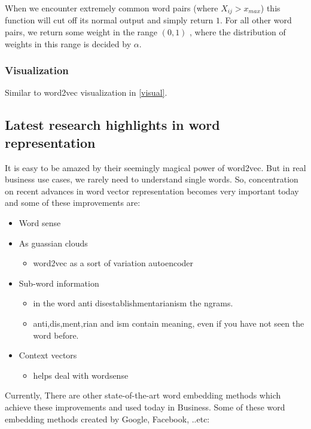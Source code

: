 When we encounter extremely common word pairs (where $X_{ij}>{x_{max}}$) this function will cut off its normal output and simply return $1$. For all other word pairs, we return some weight in the range $(0,1)$ , where the distribution of weights in this range is decided by $\alpha$.
\subsubsection{Visualization}
Similar to word2vec visualization in \ref{visual}.
\subsection{Latest research highlights in word representation}
It is easy to be amazed by their seemingly magical power of word2vec. But in real business use cases, we rarely need to understand single words. So, concentration on recent advances in word vector representation  becomes very important today and some of these improvements are:
\begin{itemize}
    \item Word sense
    \item As guassian clouds
       \begin{itemize}
              \item word2vec as a sort of variation autoencoder
       \end{itemize}
    \item Sub-word information
        \begin{itemize}
              \item in the word anti disestablishmentarianism the ngrams.
              \item anti,dis,ment,rian and ism contain meaning, even if you have not seen the word before.
       \end{itemize}
    \item Context vectors
       \begin{itemize}
             \item helps deal with wordsense
      \end{itemize}
\end{itemize}
 Currently, There are other state-of-the-art word embedding methods which achieve these improvements and used today in Business. Some of these word embedding methods created by Google, Facebook, ..etc:

